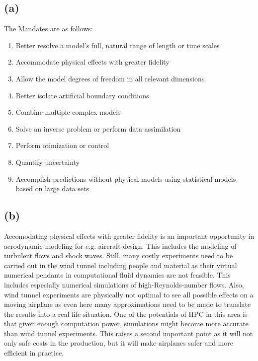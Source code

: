 \subsection*{(a)}
The Mandates are as follows:
\begin{enumerate}
\item Better resolve a model's full, natural range of length or time scales
\item Accommodate physical effects with greater fidelity
\item Allow the model degrees of freedom in all relevant dimensions
\item Better isolate artificial boundary conditions
\item Combine multiple complex models
\item Solve an inverse problem or perform data assimilation
\item Perform otimization or control
\item Quantify uncertainty
\item Accomplish predictions without physical models using statistical models based on large data sets
\end{enumerate}

\subsection*{(b)}
Accomodating physical effects with greater fidelity is an important opportunity in aerodynamic modeling for e.g. aircraft design. This includes the modeling of turbulent flows and shock waves. Still, many costly experiments need to be carried out in the wind tunnel including people and material as their virtual numerical pendants in computational fluid dynamics are not feasible. This includes especially numerical simulations of high-Reynolds-number flows. Also, wind tunnel experiments are physically not optimal to see all possible effects on a moving airplane as even here many approximations need to be made to translate the results into a real life situation. One of the potentials of HPC in this area is that given enough computation power, simulations might become more accurate than wind tunnel experiments. This raises a second important point as it will not only safe costs in the production, but it will make airplanes safer and more efficient in practice.